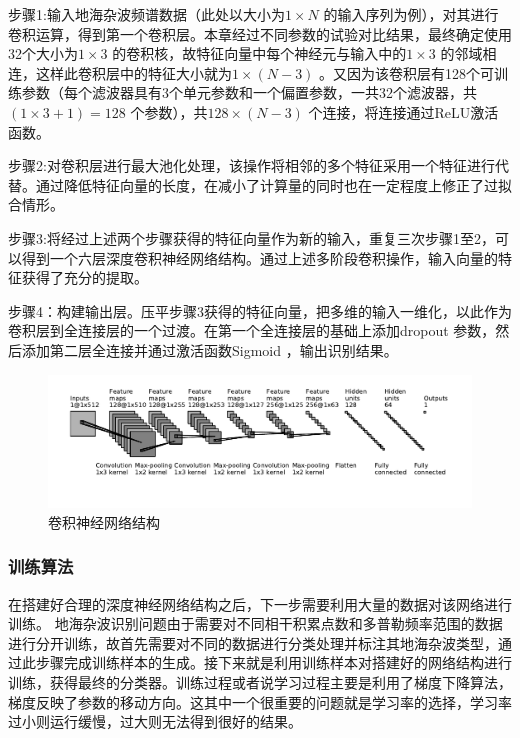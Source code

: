 步骤1:输入地海杂波频谱数据（此处以大小为$1\times N$ 的输入序列为例），对其进行卷积运算，得到第一个卷积层。本章经过不同参数的试验对比结果，最终确定使用32个大小为$1\times 3$ 的卷积核，故特征向量中每个神经元与输入中的$1\times 3$ 的邻域相连，这样此卷积层中的特征大小就为$1\times (N-3)$ 。又因为该卷积层有128个可训练参数（每个滤波器具有3个单元参数和一个偏置参数，一共32个滤波器，共$(1\times 3 + 1) = 128$ 个参数），共$128\times(N-3)$ 个连接，将连接通过ReLU激活函数。

步骤2:对卷积层进行最大池化处理，该操作将相邻的多个特征采用一个特征进行代替。通过降低特征向量的长度，在减小了计算量的同时也在一定程度上修正了过拟合情形。

步骤3:将经过上述两个步骤获得的特征向量作为新的输入，重复三次步骤1至2，可以得到一个六层深度卷积神经网络结构。通过上述多阶段卷积操作，输入向量的特征获得了充分的提取。

步骤4：构建输出层。压平步骤3获得的特征向量，把多维的输入一维化，以此作为卷积层到全连接层的一个过渡。在第一个全连接层的基础上添加dropout 参数，然后添加第二层全连接并通过激活函数Sigmoid ，输出识别结果。

\begin{figure}[hbt]
	\centering
	\includegraphics[width=\textwidth]{figures/othr/struct}
	\caption{卷积神经网络结构}
	\label{fig:struct}
\end{figure}

\subsubsection{训练算法}
在搭建好合理的深度神经网络结构之后，下一步需要利用大量的数据对该网络进行训练。
地海杂波识别问题由于需要对不同相干积累点数和多普勒频率范围的数据进行分开训练，故首先需要对不同的数据进行分类处理并标注其地海杂波类型，通过此步骤完成训练样本的生成。接下来就是利用训练样本对搭建好的网络结构进行训练，获得最终的分类器。训练过程或者说学习过程主要是利用了梯度下降算法，梯度反映了参数的移动方向。这其中一个很重要的问题就是学习率的选择，学习率过小则运行缓慢，过大则无法得到很好的结果。

